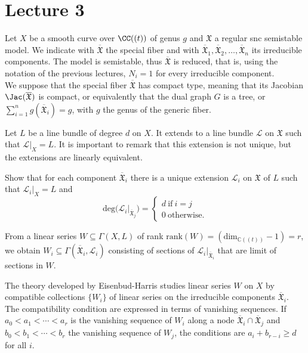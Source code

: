 \section{Lecture 3}
Let $X$ be a smooth curve over $\CC((t))$ of genus $g$ and $\mathfrak{X}$ a regular snc semistable model. We indicate with $\overline{\mathfrak{X}}$ the special fiber and with $\overline{\mathfrak{X}}_1, \overline{\mathfrak{X}}_2, \dots, \overline{\mathfrak{X}}_n$ its irreducible components. The model is semistable, thus $\overline{\mathfrak{X}}$ is reduced, that is, using the notation of the previous lectures, $N_i = 1$ for every irreducible component. \\


We suppose that the special fiber $\overline{\mathfrak{X}}$ has compact type, meaning that its Jacobian $\Jac(\overline{\mathfrak{X}})$ is compact, or equivalently that the dual graph $G$ is a tree, or $\sum_{i=1}^n g(\overline{\mathfrak{X}}_i) = g$, with $g$ the genus of the generic fiber. 

Let $L$ be a line bundle of degree $d$ on $X$. It extends to a line bundle $\mathcal{L}$ on $\mathfrak{X}$ such that $\mathcal{L}|_X = L$. It is important to remark that this extension is not unique, but the extensions are linearly equivalent. 

\begin{exercise} Show that for each component $\overline{\mathfrak{X}}_i$ there is a unique extension $\mathcal{L}_i$ on $\mathfrak{X}$ of $L$ such that $\mathcal{L}_i|_X =L$ and 
\[
\textrm{deg}\big( \mathcal{L}_i|_{\overline{\mathfrak{X}}_j} \big) = 
\begin{cases} d \ \textrm{if} \ i=j \\ 
0 \ \textrm{otherwise}. 
\end{cases}
\]
\end{exercise}

From a linear series $W \subseteq \Gamma(X,L)$ of rank $\textrm{rank}(W) = (\textrm{dim}_{\mathbb{C}((t))} - 1 )= r$, we obtain $W_i \subseteq \Gamma(\overline{\mathfrak{X}}_i, \mathcal{L}_i)$ consisting of sections of $\mathcal{L}_i|_{\overline{\mathfrak{X}}_i}$ that are limit of sections in $W$. 

The theory developed by Eisenbud-Harris studies linear series $W$ on $X$ by compatible collections $\{W_i\}$ of linear series on the irreducible components $\overline{\mathfrak{X}}_i$. The compatibility condition are expressed in terms of vanishing sequences. If $a_0 < a_1 < \cdots < a_r$ is the vanishing sequence of $W_i$ along a node $\overline{\mathfrak{X}}_i \cap \overline{\mathfrak{X}}_j$ and $b_0 < b_1 < \cdots < b_r$ the vanishing sequence of $W_j$, the conditions are $a_i + b_{r-i} \geq d$ for all $i$. \\

